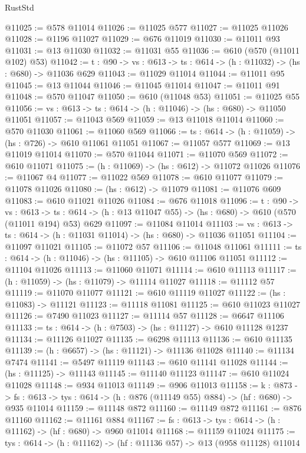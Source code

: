 \begin{lexlean}{RustStd}
\begin{coremodule}
@11025 := @578 @11014
@11026 := @11025 @577
@11027 := @11025 @11026
@11028 := @1196 @11027
@11029 := @676 @11019
@11030 := @11011 @93
@11031 := @13 @11030
@11032 := @11031 @55
@11036 := @610 (@570 (@11011 @102) @53)
@11042 := {t : @90} -> {vs : @613} -> {ts : @614} -> (h : @11032) -> (hs : @680) -> @11036 @629
@11043 := @11029 @11014
@11044 := @11011 @95
@11045 := @13 @11044
@11046 := @11045 @11014
@11047 := @11011 @91
@11048 := @570 @11047
@11050 := @610 (@11048 @53)
@11051 := @11025 @55
@11056 := {vs : @613} -> {ts : @614} -> (h : @11046) -> (hs : @680) -> @11050 @11051
@11057 := @11043 @569
@11059 := @13 @11018 @11014
@11060 := @570 @11030
@11061 := @11060 @569
@11066 := {ts : @614} -> (h : @11059) -> (hs : @726) -> @610 @11061 @11051
@11067 := @11057 @577
@11069 := @13 @11019 @11014
@11070 := @570 @11044
@11071 := @11070 @569
@11072 := @610 @11071
@11075 := (h : @11069) -> (hs : @612) -> @11072 @11026
@11076 := @11067 @4
@11077 := @11022 @569
@11078 := @610 @11077
@11079 := @11078 @11026
@11080 := (hs : @612) -> @11079
@11081 := @11076 @609
@11083 := @610 @11021 @11026
@11084 := @676 @11018
@11096 := {t : @90} ->
  {vs : @613} ->
  {ts : @614} -> (h : @13 @11047 @55) -> (hs : @680) -> @610 (@570 (@11011 @194) @53) @629
@11097 := @11084 @11014
@11103 := {vs : @613} -> {ts : @614} -> (h : @11031 @11014) -> (hs : @680) -> @11036 @11051
@11104 := @11097 @11021
@11105 := @11072 @57
@11106 := @11048 @11061
@11111 := {ts : @614} -> (h : @11046) -> (hs : @11105) -> @610 @11106 @11051
@11112 := @11104 @11026
@11113 := @11060 @11071
@11114 := @610 @11113
@11117 := (h : @11059) -> (hs : @11079) -> @11114 @11027
@11118 := @11112 @57
@11119 := @11070 @11077
@11121 := @610 @11119 @11027
@11122 := (hs : @11083) -> @11121
@11123 := @11118 @11081
@11125 := @610 @11023 @11027
@11126 := @7490 @11023
@11127 := @11114 @57
@11128 := @6647 @11106
@11133 := {ts : @614} -> (h : @7503) -> (hs : @11127) -> @610 @11128 @1237
@11134 := @11126 @11027
@11135 := @6298 @11113
@11136 := @610 @11135
@11139 := (h : @6657) -> (hs : @11121) -> @11136 @11028
@11140 := @11134 @7474
@11141 := @5497 @11119
@11143 := @610 @11141 @11028
@11144 := (hs : @11125) -> @11143
@11145 := @11140 @11123
@11147 := @610 @11024 @11028
@11148 := @934 @11013
@11149 := @906 @11013
@11158 := {k : @873} ->
  {fs : @613} -> {tys : @614} -> (h : @876 (@11149 @55) @884) -> (hf : @680) -> @935 @11014
@11159 := @11148 @872
@11160 := @11149 @872
@11161 := @876 @11160
@11162 := @11161 @884
@11167 := {fs : @613} -> {tys : @614} -> (h : @11162) -> (hf : @680) -> @960 @11014
@11168 := @11159 @11024
@11175 := {tys : @614} -> (h : @11162) -> (hf : @11136 @57) -> @13 (@958 @11128) @11014

\end{coremodule}
\end{lexlean}
